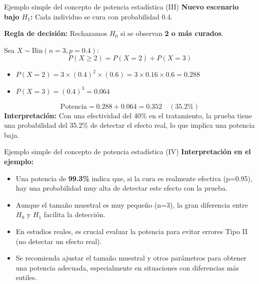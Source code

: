 ﻿\documentclass{beamer}
\begin{document}
\begin{frame}{Ejemplo simple del concepto de potencia estadística (III)}
\textbf{Nuevo escenario bajo $H_1$:} Cada individuo se cura con probabilidad 0.4.

\vspace{0.3cm}
\textbf{Regla de decisión:} Rechazamos $H_0$ si se observan \textbf{2 o más curados}.

\vspace{0.3cm}
Sea $X \sim \text{Bin}(n=3, p=0.4)$:
\[
P(X \geq 2) = P(X=2) + P(X=3)
\]
\begin{itemize}
    \item $P(X=2)= 3\times (0.4)^2 \times (0.6)= 3\times 0.16 \times 0.6 = 0.288$
    \item $P(X=3)= (0.4)^3 = 0.064$
\end{itemize}
\[
\text{Potencia} = 0.288 + 0.064 = 0.352 \quad (35.2\%)
\]
\textbf{Interpretación:} Con una efectividad del 40\% en el tratamiento, la prueba tiene una probabilidad del 35.2\% de detectar el efecto real, lo que implica una potencia baja.
\end{frame}



\begin{frame}{Ejemplo simple del concepto de potencia estadística (IV)}
\textbf{Interpretación en el ejemplo:}
\begin{itemize}
    \item Una potencia de \textbf{99.3\%} indica que, si la cura es realmente efectiva (p=0.95), hay una probabilidad muy alta de detectar este efecto con la prueba.
    \item Aunque el tamaño muestral es muy pequeño (n=3), la gran diferencia entre $H_0$ y $H_1$ facilita la detección.
    \item En estudios reales, es crucial evaluar la potencia para evitar errores Tipo II (no detectar un efecto real).
    \item Se recomienda ajustar el tamaño muestral y otros parámetros para obtener una potencia adecuada, especialmente en situaciones con diferencias más sutiles.
\end{itemize}
\end{frame}
\end{document}
